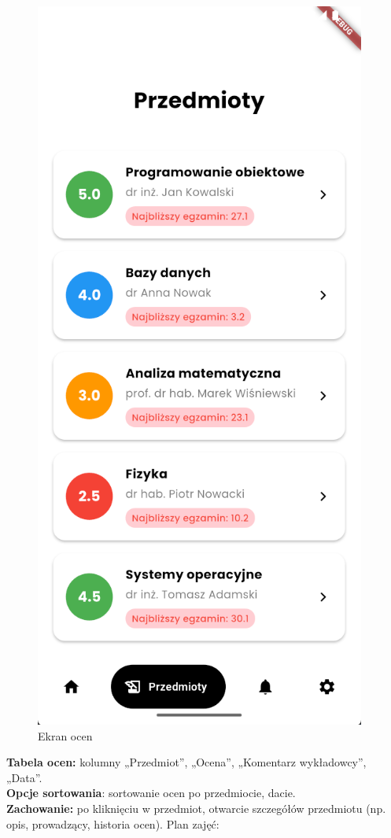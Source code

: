 \begin{itemize}
\begin{figure}[htb!]
                  \includegraphics[width=0.65\linewidth]{rys/ekranocen.png}
                  \caption{Ekran ocen}
                  \label{rys:ekranocen}
            \end{figure}
            \newpage
            \textbf{Tabela ocen:} kolumny „Przedmiot”, „Ocena”, „Komentarz wykładowcy”, „Data”.
            \\\textbf{Opcje sortowania}: sortowanie ocen po przedmiocie, dacie.
            \\\textbf{Zachowanie:} po kliknięciu w przedmiot, otwarcie szczegółów przedmiotu (np. opis, prowadzący, historia ocen).
            Plan zajęć:


\end{itemize}
